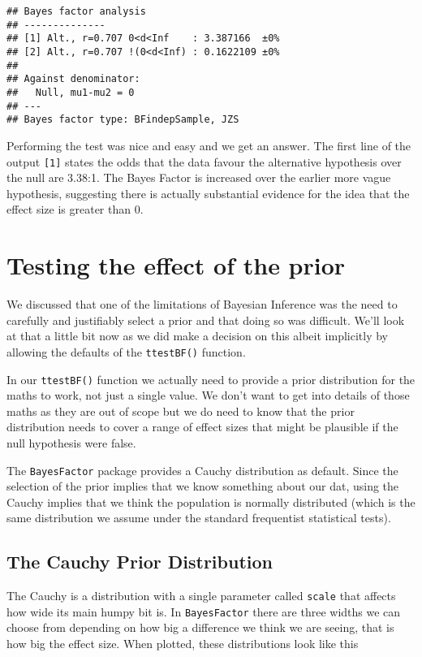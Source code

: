 \documentclass[
]{book}
\begin{document}
\begin{verbatim}
## Bayes factor analysis
## --------------
## [1] Alt., r=0.707 0<d<Inf    : 3.387166  ±0%
## [2] Alt., r=0.707 !(0<d<Inf) : 0.1622109 ±0%
## 
## Against denominator:
##   Null, mu1-mu2 = 0 
## ---
## Bayes factor type: BFindepSample, JZS
\end{verbatim}

Performing the test was nice and easy and we get an answer. The first line of the output \texttt{{[}1{]}} states the odds that the data favour the alternative hypothesis over the null are 3.38:1. The Bayes Factor is increased over the earlier more vague hypothesis, suggesting there is actually substantial evidence for the idea that the effect size is greater than 0.

\hypertarget{testing-the-effect-of-the-prior}{%
\section{Testing the effect of the prior}\label{testing-the-effect-of-the-prior}}

We discussed that one of the limitations of Bayesian Inference was the need to carefully and justifiably select a prior and that doing so was difficult. We'll look at that a little bit now as we did make a decision on this albeit implicitly by allowing the defaults of the \texttt{ttestBF()} function.

In our \texttt{ttestBF()} function we actually need to provide a prior distribution for the maths to work, not just a single value. We don't want to get into details of those maths as they are out of scope but we do need to know that the prior distribution needs to cover a range of effect sizes that might be plausible if the null hypothesis were false.

The \texttt{BayesFactor} package provides a Cauchy distribution as default. Since the selection of the prior implies that we know something about our dat, using the Cauchy implies that we think the population is normally distributed (which is the same distribution we assume under the standard frequentist statistical tests).

\hypertarget{the-cauchy-prior-distribution}{%
\subsection{The Cauchy Prior Distribution}\label{the-cauchy-prior-distribution}}

The Cauchy is a distribution with a single parameter called \texttt{scale} that affects how wide its main humpy bit is. In \texttt{BayesFactor} there are three widths we can choose from depending on how big a difference we think we are seeing, that is how big the effect size. When plotted, these distributions look like this
\end{document}

